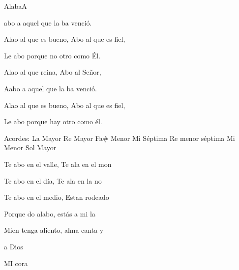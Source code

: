 \documentclass[12pt, spanish]{book}
\begin{document}
\begin{song}{Alaba}{A}
\begin{SBOpGroup}
            abo a aquel que la ba venció.

            Alao al que es bueno, Abo al que es fiel,

            Le abo porque no  otro como Él.

            Alao al que reina, Abo al Señor,

            Aabo a aquel que la ba venció.

            Alao al que es bueno, Abo al que es fiel,

            Le abo porque  hay otro como él.
        \end{SBOpGroup}

        \ifChordBk
        \begin{SBOpGroup}
            Acordes:
            \upchord{\A}\qquad La Mayor \hfill
            \upchord{\D}\qquad Re Mayor \hfill\null\break
            \upchord{\Fsm}\qquad Fa\# Menor \hfill
            \upchord{\Eseven}\qquad Mi S\'eptima \hfill\null\break
            \upchord{\Dmseven}Re menor s\'eptima \hfill
            \upchord{\Em}\qquad Mi Menor \hfill\null\break
            \upchord{\G}\qquad Sol Mayor \hfill
        \end{SBOpGroup}
        \fi

        \begin{SBExtraKeys}{

            \begin{SBOpGroup}
                Te abo en el valle, Te ala en el mon

                Te abo en el día, Te ala en la no

                Te abo en el medio, Estan rodeado

                Porque do alabo,  estás a mi la

                Mien tenga aliento,  alma canta y
            \end{SBOpGroup}

            \begin{SBChorus}
                 a Dios

                MI cora
            \end{SBChorus}

}
\end{SBExtraKeys}
\end{song}
\end{document}
